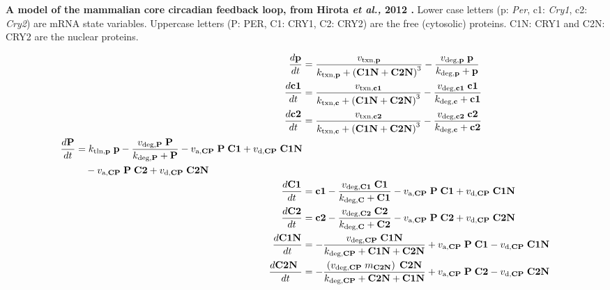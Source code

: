 \documentclass[11pt, letterpaper]{article}
\begin{document}
\begin{table}[p]
  \centering
  \caption{{\bfseries A model of the mammalian core circadian feedback loop, from Hirota {\itshape et al.,} 2012 \cite{Hirota2012}.} Lower case letters (p: {\it Per}, c1: {\it Cry1}, c2: {\it Cry2}) are mRNA state variables. Uppercase letters (P: PER, C1: CRY1, C2: CRY2) are the free (cytosolic) proteins. C1N: CRY1 and C2N: CRY2 are the nuclear proteins.}

  \begin{align}
    \label{eq:p}
    \frac{d\mathrm{\bf p}}{dt}    & = \frac{v_{\text{txn,{\bf p}}}}{k_{\text{txn,{\bf p}}} + \left(\text{\bf C1N} + \text{\bf C2N} \right)^3} - \frac{v_{\text{deg,{\bf p}}} \;\text{\bf p} }{k_{\text{deg,{\bf p}}} +\text{\bf p} } \\
    \label{eq:c1}
    \frac{d\text{\bf c1}}{dt}   & = \frac{v_{\text{txn,{\bf c1}}}}{k_{\text{txn,{\bf c}}} + \left(\text{\bf C1N} + \text{\bf C2N} \right)^3} - \frac{v_{\text{deg,{\bf c1}}} \;\text{\bf c1} }{k_{\text{deg,{\bf c}}} +\text{\bf c1} } \\
    \label{eq:c2}
    \frac{d\text{\bf c2}}{dt}   & = \frac{v_{\text{txn,{\bf c2}}}}{k_{\text{txn,{\bf c}}} + \left(\text{\bf C1N} + \text{\bf C2N} \right)^3} - \frac{v_{\text{deg,{\bf c2}}} \;\text{\bf c2} }{k_{\text{deg,{\bf c}}} +\text{\bf c2} } \\
    \begin{split}
      \frac{d\text{\bf P}}{dt}  & = k_\text{tln,{\bf p}} \;\text{\bf p}  - \frac{v_{\text{deg,{\bf P}}} \;\text{\bf P} }{k_{\text{deg,{\bf P}}} +\text{\bf P} } - v_{\text{a,{\bf CP}}} \;\text{\bf P}  \;\text{\bf C1}  + v_{\text{d,{\bf CP}}} \;\text{\bf C1N} \\
      & \quad - v_{\text{a,{\bf CP}}} \;\text{\bf P}  \;\text{\bf C2}  + v_{\text{d,{\bf CP}}} \; \text{\bf C2N}
    \end{split} \\
    \frac{d\text{\bf C1}}{dt}   & =\text{\bf c1}  - \frac{v_{\text{deg,{\bf C1}}} \;\text{\bf C1} }{k_{\text{deg,{\bf C}}} +\text{\bf C1} } - v_{\text{a,{\bf CP}}} \;\text{\bf P}  \;\text{\bf C1}  + v_{\text{d,{\bf CP}}} \;\text{\bf C1N} \\
    \frac{d\text{\bf C2}}{dt}   & =\text{\bf c2} - \frac{ v_{\text{deg,{\bf C2}}} \;\text{\bf C2} }{k_{\text{deg,{\bf C}}} +\text{\bf C2} } - v_{\text{a,{\bf CP}}} \;\text{\bf P}  \;\text{\bf C2}  + v_{\text{d,{\bf CP}}} \; \text{\bf C2N} \\
    \frac{d\text{\bf C1N}}{dt}  & = - \frac{ v_{\text{deg,{\bf CP}}} \;\text{\bf C1N} }{k_{\text{deg,{\bf CP}}} +\text{\bf C1N}  + \text{\bf C2N} } + v_{\text{a,{\bf CP}}} \;\text{\bf P}  \;\text{\bf C1} - v_{\text{d,{\bf CP}}} \;\text{\bf C1N} \\
    \label{eq:C2N}
    \frac{d\text{\bf C2N }}{dt} & = - \frac{ \left(v_{\text{deg,{\bf CP}}} \; m_{\text{\bf C2N}}\right) \; \text{\bf C2N} }{k_{\text{deg,{\bf CP}}} + \text{\bf C2N}  +\text{\bf C1N} } + v_{\text{a,{\bf CP}}} \;\text{\bf P}  \;\text{\bf C2} - v_{\text{d,{\bf CP}}} \; \text{\bf C2N}
  \end{align}
  \label{tab:model}
\end{table}
\end{document}
